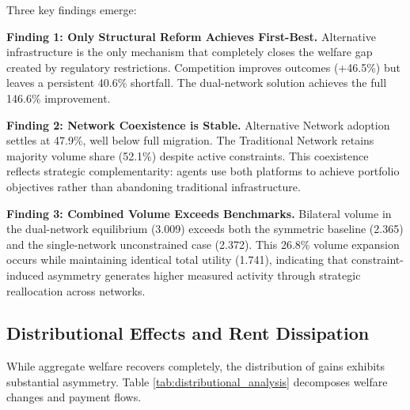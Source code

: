 \documentclass[12pt]{article}
\begin{document}
Three key findings emerge:

\textbf{Finding 1: Only Structural Reform Achieves First-Best.} Alternative infrastructure is the only mechanism that completely closes the welfare gap created by regulatory restrictions. Competition improves outcomes (+46.5\%) but leaves a persistent 40.6\% shortfall. The dual-network solution achieves the full 146.6\% improvement.

\textbf{Finding 2: Network Coexistence is Stable.} Alternative Network adoption settles at 47.9\%, well below full migration. The Traditional Network retains majority volume share (52.1\%) despite active constraints. This coexistence reflects strategic complementarity: agents use both platforms to achieve portfolio objectives rather than abandoning traditional infrastructure.

\textbf{Finding 3: Combined Volume Exceeds Benchmarks.} Bilateral volume in the dual-network equilibrium (3.009) exceeds both the symmetric baseline (2.365) and the single-network unconstrained case (2.372). This 26.8\% volume expansion occurs while maintaining identical total utility (1.741), indicating that constraint-induced asymmetry generates higher measured activity through strategic reallocation across networks.

\subsection{Distributional Effects and Rent Dissipation}

While aggregate welfare recovers completely, the distribution of gains exhibits substantial asymmetry. Table \ref{tab:distributional_analysis} decomposes welfare changes and payment flows.

\end{document}
